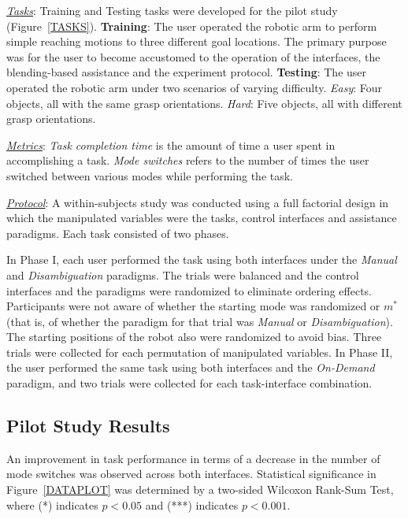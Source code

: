\documentclass[conference]{IEEEtran}
\begin{document}
\noindent\underline{\textit{Tasks}}: Training and Testing tasks were developed for the pilot study (Figure~\ref{TASKS}). \textbf{Training}: The user operated the robotic arm to perform simple reaching motions to three different goal locations. The primary purpose was for the user to become accustomed to the operation of the interfaces, the blending-based assistance and the experiment protocol. \textbf{Testing}: The user operated the robotic arm under two scenarios of varying difficulty. \textit{Easy}: Four objects, all with the same grasp orientations. \textit{Hard}: Five objects, all with different grasp orientations.

\noindent\underline{\textit{Metrics}}: \textit{Task completion time} is the amount of time a user spent in accomplishing a task. \textit{Mode switches} refers to the number of times the user switched between various modes while performing the task. 

\noindent\underline{\textit{Protocol}}: A within-subjects study was conducted using a full factorial design in which the manipulated variables were the tasks, control interfaces and assistance paradigms. Each task consisted of two phases. 

In Phase I, each user performed the task using both interfaces under the \textit{Manual} and \textit{Disambiguation} paradigms. The trials were balanced and the control interfaces and the paradigms were randomized to eliminate ordering effects. Participants were not aware of whether the
starting mode was randomized or $m^*$ (that is, of whether the paradigm
for that trial was \textit{Manual} or \textit{Disambiguation}). The starting positions of the robot also were randomized to avoid bias. Three trials were collected for each permutation of manipulated variables. 
In Phase II, the user performed the same task using both interfaces and the \textit{On-Demand} paradigm, and two trials were collected for each task-interface combination.  

\subsection{Pilot Study Results}\label{RES}
An improvement in task performance in terms of a decrease in the number of mode switches was observed across both interfaces. Statistical significance in Figure~\ref{DATAPLOT} was determined by a two-sided Wilcoxon Rank-Sum Test, where (*) indicates $p < 0.05$ and (***) indicates $p < 0.001$.
\end{document}
